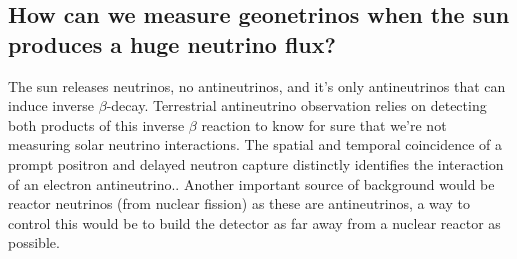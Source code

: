 \documentclass[10pt,a4paper,twoside]{article}
\begin{document}
\subsection{How can we measure geonetrinos when the sun produces a huge neutrino flux?}
The sun releases neutrinos, no antineutrinos, and it's only antineutrinos that can induce inverse $\beta$-decay. Terrestrial antineutrino observation relies on detecting both products of this inverse $\beta$ reaction to know for sure that we're not measuring solar neutrino interactions. The spatial and temporal coincidence of a prompt positron and delayed neutron capture distinctly identifies the interaction of an electron antineutrino.\cite{Geo-neutrinoObservation}. Another important source of background would be reactor neutrinos (from nuclear fission) as these are antineutrinos, a way to control this would be to build the detector as far away from a nuclear reactor as possible.


\end{document}
